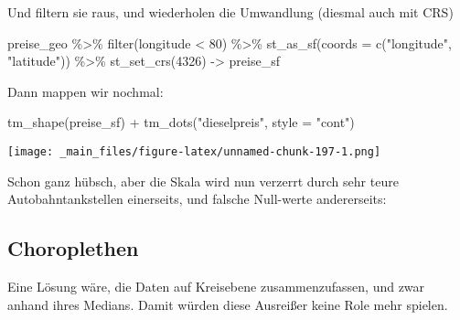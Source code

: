 \documentclass[
  ngerman,
]{article}
\newenvironment{Shaded}{\begin{snugshade}}{\end{snugshade}}
\newcommand{\AttributeTok}[1]{\textcolor[rgb]{0.77,0.63,0.00}{#1}}
\newcommand{\DecValTok}[1]{\textcolor[rgb]{0.00,0.00,0.81}{#1}}
\newcommand{\DocumentationTok}[1]{\textcolor[rgb]{0.56,0.35,0.01}{\textbf{\textit{#1}}}}
\newcommand{\FunctionTok}[1]{\textcolor[rgb]{0.00,0.00,0.00}{#1}}
\newcommand{\NormalTok}[1]{#1}
\newcommand{\OtherTok}[1]{\textcolor[rgb]{0.56,0.35,0.01}{#1}}
\newcommand{\SpecialCharTok}[1]{\textcolor[rgb]{0.00,0.00,0.00}{#1}}
\newcommand{\StringTok}[1]{\textcolor[rgb]{0.31,0.60,0.02}{#1}}
\begin{document}
Und filtern sie raus, und wiederholen die Umwandlung (diesmal auch mit CRS)

\begin{Shaded}
\begin{Highlighting}[]
\NormalTok{preise\_geo }\SpecialCharTok{\%\textgreater{}\%}
  \FunctionTok{filter}\NormalTok{(longitude }\SpecialCharTok{\textless{}} \DecValTok{80}\NormalTok{) }\SpecialCharTok{\%\textgreater{}\%}
  \FunctionTok{st\_as\_sf}\NormalTok{(}\AttributeTok{coords =} \FunctionTok{c}\NormalTok{(}\StringTok{"longitude"}\NormalTok{, }\StringTok{"latitude"}\NormalTok{)) }\SpecialCharTok{\%\textgreater{}\%}
  \FunctionTok{st\_set\_crs}\NormalTok{(}\DecValTok{4326}\NormalTok{) }\OtherTok{{-}\textgreater{}}\NormalTok{ preise\_sf}
\end{Highlighting}
\end{Shaded}

Dann mappen wir nochmal:

\begin{Shaded}
\begin{Highlighting}[]
\FunctionTok{tm\_shape}\NormalTok{(preise\_sf) }\SpecialCharTok{+}
  \FunctionTok{tm\_dots}\NormalTok{(}\StringTok{"dieselpreis"}\NormalTok{, }\AttributeTok{style =} \StringTok{"cont"}\NormalTok{)}
\end{Highlighting}
\end{Shaded}

\texttt{[image: \_main\_files/figure-latex/unnamed-chunk-197-1.png]}

Schon ganz hübsch, aber die Skala wird nun verzerrt durch sehr teure Autobahntankstellen einerseits, und falsche Null-werte andererseits:

\begin{Shaded}
\end{Shaded}

\hypertarget{choroplethen-1}{%
\subsection{Choroplethen}\label{choroplethen-1}}

Eine Lösung wäre, die Daten auf Kreisebene zusammenzufassen, und zwar anhand ihres Medians. Damit würden diese Ausreißer keine Role mehr spielen.
\end{document}
